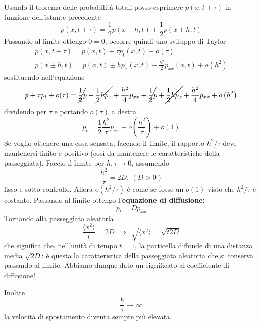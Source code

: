 \documentclass[10pt,a4paper,twoside,openright]{book}
\begin{document}
Usando il teorema delle probabilità totali posso esprimere $\displaystyle p(x,t+\tau)$ in funzione dell'istante precedente
\begin{equation*}
p(x,t+\tau) =\frac{1}{2} p(x-h,t) +\frac{1}{2} p(x+h,t)
\end{equation*}
Passando al limite ottengo $0=0$, occorre quindi uno sviluppo di Taylor
\begin{gather*}
p(x,t+\tau) =p(x,t) +\tau p_{t}(x,t) +o(\tau)\\
p(x\pm h,t) =p(x,t) \pm hp_{x}(x,t) +\frac{h^{2}}{2} p_{xx}(x,t) +o\left(h^{2}\right)
\end{gather*}
sostituendo nell'equazione
\begin{equation*}
\cancel{p} +\tau p_{t} +o(\tau) =\cancel{\frac{1}{2} p} -\cancel{\frac{1}{2} hp_{x}} +\frac{h^{2}}{4} p_{xx} +\cancel{\frac{1}{2} p} +\cancel{\frac{1}{2} hp_{x}} +\frac{h^{2}}{4} p_{xx} +o\left(h^{2}\right)
\end{equation*}
dividendo per $\displaystyle \tau $ e portando $\displaystyle o(\tau)$ a destra
\begin{equation*}
p_{t} =\frac{1}{2}\frac{h^{2}}{\tau } p_{xx} +o\left(\frac{h^{2}}{\tau }\right) +o(1)
\end{equation*}
Se voglio ottenere una cosa sensata, facendo il limite, il rapporto $\displaystyle h^{2} /\tau $ deve mantenersi finito e positivo (così da mantenere le caratteristiche della passeggiata). Faccio il limite per $\displaystyle h,\tau \rightarrow 0$, assumendo
\begin{equation*}
\frac{h^{2}}{\tau } =2D,\ (D >0)
\end{equation*}
fisso e sotto controllo. Allora $\displaystyle o\left(h^{2} /\tau \right)$ è come se fosse un $o(1)$ visto che $\displaystyle h^{2} /\tau $ è costante. Passando al limite ottengo l'\textbf{equazione di diffusione:}
\begin{equation*}
\boxed{p_{t} =Dp_{xx}}
\end{equation*}
Tornando alla passeggiata aleatoria
\begin{equation*}
\frac{\langle x^{2} \rangle }{t} =2D\ \ \Rightarrow \ \ \sqrt{\langle x^{2} \rangle } =\sqrt{t2D}
\end{equation*}
che significa che, nell'unità di tempo $t=1$, la particella diffonde di una distanza media $\displaystyle \sqrt{2D}$: è questa la caratteristica della passeggiata aleatoria che si conserva passando al limite. Abbiamo dunque dato un significato al coefficiente di diffusione!

Inoltre 
\begin{equation*}
\frac{h}{\tau }\rightarrow \infty 
\end{equation*}
la velocità di spostamento diventa sempre più elevata.
\end{document}
